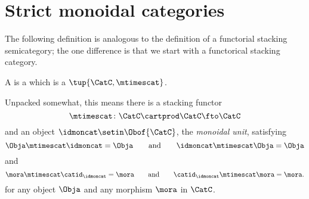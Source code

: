 
\section{Strict monoidal categories}
\label{sec:strict-monoidal-categories}

The following definition is analogous to the definition of a functorial stacking semicategory; the one difference is that we start with a functorical stacking category. 

\begin{ctdefinition}
    \label{def:strict-monoidal-category}
     A  is a  which is a  $\tup{\CatC, \mtimescat}$. 
     
     
     Unpacked somewhat, this means there is a stacking functor
\begin{equation}
\mtimescat \colon \CatC \cartprod \CatC \fto \CatC
\end{equation}
and an object $\idmoncat \setin \Obof{\CatC}$,  the \emph{monoidal unit}, satisfying
              \begin{equation}
                  \Obja \mtimescat \idmoncat = \Obja \qquad \text{and} \qquad \idmoncat \mtimescat \Obja = \Obja
              \end{equation}
              and
              \begin{equation}
                  \mora \mtimescat \catid_\idmoncat = \mora \qquad \text{and} \qquad \catid_\idmoncat \mtimescat  \mora = \mora.
              \end{equation}
              for any object $\Obja$ and any morphism $\mora$ in $\CatC$. 
\end{ctdefinition}





